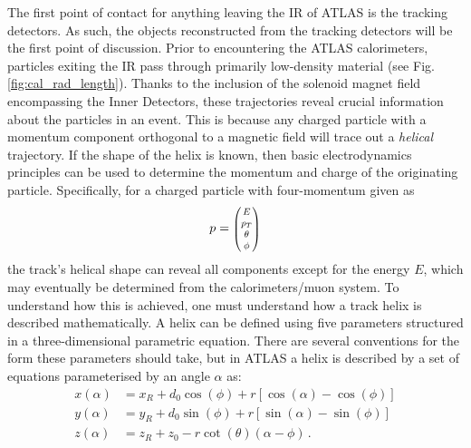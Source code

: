             The first point of contact for anything leaving the IR of ATLAS is the tracking detectors.
            As such, the objects reconstructed from the tracking detectors will be the first point of discussion.
            Prior to encountering the ATLAS calorimeters,
                particles exiting the IR pass through primarily low-density material (see Fig. \ref{fig:cal_rad_length}).
            Thanks to the inclusion of the solenoid magnet field encompassing the Inner Detectors,
                these trajectories reveal crucial information about the particles in an event.
            This is because any charged particle with a momentum component orthogonal to a magnetic field
                will trace out a \textit{helical} trajectory.
            If the shape of the helix is known, then basic electrodynamics principles can be used to determine the
                momentum and charge of the originating particle.
            Specifically, for a charged particle with four-momentum given as 
            \begin{equation}
            p = \minimatrix{E \\ p_T \\ \theta \\ \phi}
            \end{equation}
            the track's helical shape can reveal all components except for the energy $E$,
                which may eventually be determined from the calorimeters/muon system.
            To understand how this is achieved, one must understand how a track helix is described mathematically.
            A helix can be defined using five parameters structured in a three-dimensional parametric equation\cite{thesis_giacinto}.
            There are several conventions for the form these parameters should take,
                but in ATLAS a helix is described by a set of equations parameterised by an angle $\alpha$ as:
            \begin{equation} \begin{split}
                x(\alpha) &= x_R + d_0 \cos(\phi) + r \left[ \cos(\alpha) - \cos(\phi) \right] \\
                y(\alpha) &= y_R + d_0 \sin(\phi) + r \left[ \sin(\alpha) - \sin(\phi) \right] \\
                z(\alpha) &= z_R + z_0 - r \cot(\theta) (\alpha - \phi)
                \,.
            \end{split} \end{equation}

